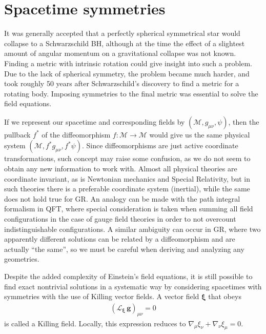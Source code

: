 
\section{Spacetime symmetries}

It was generally accepted that a perfectly spherical symmetrical star would collapse to a Schwarzschild BH, although at the time the effect of a slightest amount of angular momentum on a gravitational collapse was not known.
Finding a metric with intrinsic rotation could give insight into such a problem. Due to the lack of spherical symmetry, the problem became much harder, and took roughly 50 years after Schwarzschild's discovery to find a metric for a rotating body.
Imposing symmetries to the final metric was essential to solve the field equations.

If we represent our spacetime and corresponding fields by $(\mathscr{M}, g_{\mu\nu}, \psi)$, then the pullback $f^*$ of the diffeomorphism $f:\mathscr{M}\rightarrow\mathscr{M}$ would give us the same physical system $(\mathscr{M}, f^* g_{\mu\nu}, f^* \psi)$.
Since diffeomorphisms are just active coordinate transformations, such concept may raise some confusion, as we do not seem to obtain any new information to work with. 
Almost all physical theories are coordinate invariant, as is Newtonian mechanics and Special Relativity, but in such theories there is a preferable coordinate system (inertial), while the same does not hold true for GR.
An analogy can be made with the path integral formalism in QFT, where special consideration is taken when summing all field configurations in the case of gauge field theories in order to not overcount indistinguishable configurations.
A similar ambiguity can occur in GR, where two apparently different solutions can be related by a diffeomorphism and are actually ``the same'', so we must be careful when deriving and analyzing any geometries.

Despite the added complexity of Einstein's field equations, it is still possible to find exact nontrivial solutions in a systematic way by considering spacetimes with symmetries with the use of Killing vector fields.
A vector field $\bm{\xi}$ that obeys
\begin{align}
    \left(\mathscr{L}_{\bm{\xi}} \,\bm{g} \right)_{\mu\nu} = 0  
    \label{eq2:killing}
\end{align}
is called a Killing field. Locally, this expression reduces to $\nabla_\mu \xi_\nu + \nabla_\nu \xi_\mu = 0$.

